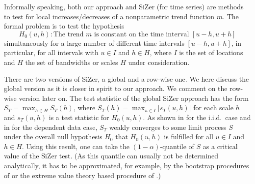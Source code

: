 \documentclass[a4paper,12pt]{article}
\begin{document}
Informally speaking, both our approach and SiZer (for time series) are methods to test for local increases/decreases of a nonparametric trend function $m$. The formal problem is to test the hypothesis
\[ H_0(u,h): \text{The trend } m \text{ is constant on the time interval } [u-h,u+h] \]
simultaneously for a large number of different time intervals $[u-h,u+h]$, in particular, for all intervals with $u \in I$ and $h \in H$, where $I$ is the set of locations and $H$ the set of bandwidths or scales $H$ under consideration. 

There are two versions of SiZer, a global and a row-wise one. We here discuss the global version as it is closer in spirit to our approach. We comment on the row-wise version later on. The test statistic of the global SiZer approach has the form $S_T = \max_{h \in H} S_T(h)$, where $S_T(h) = \max_{u \in I} |s_T(u,h)|$ for each scale $h$ and $s_T(u,h)$ is a test statistic for $H_0(u,h)$. As shown in \cite{ChaudhuriMarron2000} for the i.i.d.\ case and in \cite{ParkHannigKang2009} for the dependent data case, $S_T$ weakly converges to some limit process $S$ under the overall null hypothesis $H_0$ that $H_0(u,h)$ is fulfilled for all $u \in I$ and $h \in H$. Using this result, one can take the $(1-\alpha)$-quantile of $S$ as a critical value of the SiZer test. (As this quantile can usually not be determined analytically, it has to be approximated, for example, by the bootstrap procedures of \cite{ChaudhuriMarron2000} or the extreme value theory based procedure of \cite{HannigMarron2006}.)
\end{document}

